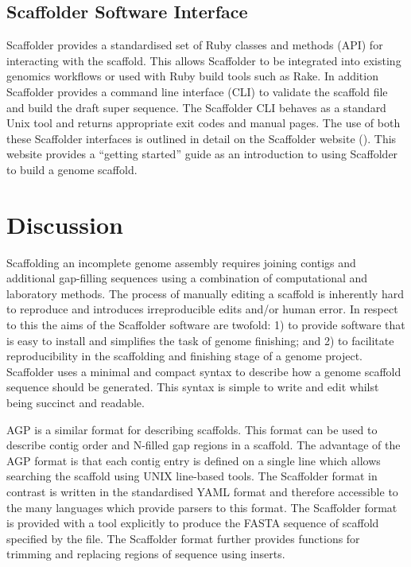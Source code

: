 \documentclass[10pt]{bmc_article}
\newenvironment{bmcformat}{\begin{raggedright}\baselineskip20pt\sloppy\setboolean{publ}{false}}{\end{raggedright}\baselineskip20pt\sloppy}
\begin{document}
\begin{bmcformat}
\subsection*{Scaffolder Software Interface} %

Scaffolder provides a standardised set of Ruby classes and methods (API) for
interacting with the scaffold. This allows Scaffolder to be integrated into
existing genomics workflows or used with Ruby build tools such as Rake. In
addition Scaffolder provides a command line interface (CLI) to validate the
scaffold file and build the draft super sequence. The Scaffolder CLI behaves as
a standard Unix tool and returns appropriate exit codes and manual pages. The
use of both these Scaffolder interfaces is outlined in detail on the Scaffolder
website (\scaffolder). This website provides a ``getting started'' guide as an
introduction to using Scaffolder to build a genome scaffold. \pb

\clearpage

\section*{Discussion} %

Scaffolding an incomplete genome assembly requires joining contigs and
additional gap-filling sequences using a combination of computational and
laboratory methods. The process of manually editing a scaffold is inherently
hard to reproduce and introduces irreproducible edits and/or human error. In
respect to this the aims of the Scaffolder software are twofold: 1) to provide
software that is easy to install and simplifies the task of genome finishing;
and 2) to facilitate reproducibility in the scaffolding and finishing stage of
a genome project. Scaffolder uses a minimal and compact syntax to describe how
a genome scaffold sequence should be generated. This syntax is simple to write
and edit whilst being succinct and readable. \pb

AGP is a similar format for describing scaffolds. This format can be used to
describe contig order and N-filled gap regions in a scaffold. The advantage of
the AGP format is that each contig entry is defined on a single line which
allows searching the scaffold using UNIX line-based tools. The Scaffolder
format in contrast is written in the standardised YAML format and therefore
accessible to the many languages which provide parsers to this format. The
Scaffolder format is provided with a tool explicitly to produce the FASTA
sequence of scaffold specified by the file. The Scaffolder format further
provides functions for trimming and replacing regions of sequence using
inserts. \pb


\end{bmcformat}
\end{document}
